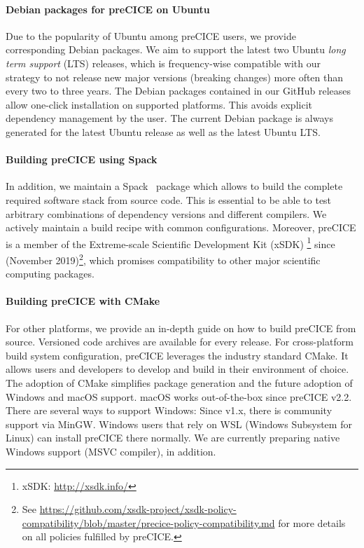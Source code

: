 \paragraph{Debian packages for preCICE on Ubuntu}
Due to the popularity of Ubuntu among preCICE users, we provide corresponding Debian packages.
We aim to support the latest two Ubuntu \textit{long term support} (LTS) releases, which is frequency-wise compatible with our
strategy to not release new major versions (breaking changes) more often than every two to three years.
The Debian packages contained in our GitHub releases allow one-click installation on supported platforms.
This avoids explicit dependency management by the user. The current Debian package is always generated for 
the latest Ubuntu release as well as the latest Ubuntu LTS.

\paragraph{Building preCICE using Spack}
In addition, we maintain a Spack~\cite{spack} package which allows to build the complete required software stack
from source code. 
This is essential to be able to test arbitrary combinations of dependency versions and different compilers.
We actively maintain a build recipe with common
configurations. Moreover, preCICE is a member of the Extreme-scale Scientific Development Kit (xSDK) \footnote{xSDK: \url{http://xsdk.info/}} since  (November 2019)\footnote{See \url{https://github.com/xsdk-project/xsdk-policy-compatibility/blob/master/precice-policy-compatibility.md} for more details on all policies fulfilled by preCICE.}, which promises
compatibility to other major scientific computing packages.



\paragraph{Building preCICE with CMake}
For other platforms, we provide an in-depth guide on how to build preCICE from source. Versioned code archives are available for every release.
For cross-platform build system configuration, preCICE leverages the industry standard CMake.
It allows users and developers to develop and build in their environment of choice.
The adoption of CMake simplifies package generation and the future adoption of Windows and macOS support.
macOS works out-of-the-box since preCICE v2.2. There are several ways to support Windows:
Since v1.x, there is community support via MinGW.
Windows users that rely on WSL (Windows Subsystem for Linux) can install preCICE there normally.
We are currently preparing native Windows support (MSVC compiler), in addition. 

